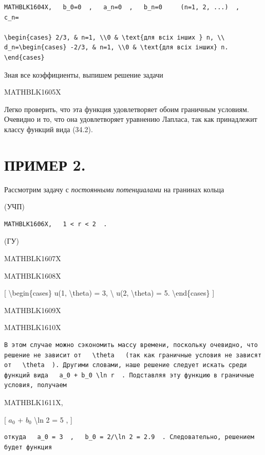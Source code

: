 \documentclass[
]{article}
\begin{document}
{{{\begin{verbatim}
MATHBLK1604X,   b_0=0  ,   a_n=0  ,   b_n=0     (n=1, 2, ...)  ,   c_n=

\begin{cases} 2/3, & n=1, \\0 & \text{для всіх інших } n, \\ d_n=\begin{cases} -2/3, & n=1, \\0 & \text{для всіх інших} n. \end{cases}
\end{verbatim}

Зная все коэффициенты, выпишем решение задачи

MATHBLK1605X

Легко проверить, что эта функция удовлетворяет обоим граничным условиям.
Очевидно и то, что она удовлетворяет уравнению Лапласа, так как
принадлежит классу функций вида (34.2).

\section{ПРИМЕР 2.}\label{ux43fux440ux438ux43cux435ux440-2.}

Рассмотрим задачу с \emph{постоянными потенциалами} на гранинах кольца

(УЧП)

\begin{verbatim}
MATHBLK1606X,   1 < r < 2  .
\end{verbatim}

(ГУ)

MATHBLK1607X

MATHBLK1608X

{[} \textbackslash begin\{cases\} u(1, \textbackslash theta) = 3,
\textbackslash{} u(2, \textbackslash theta) = 5.
\textbackslash end\{cases\} {]}

MATHBLK1609X

MATHBLK1610X

\begin{verbatim}
В этом случае можно сэкономить массу времени, поскольку очевидно, что решение не зависит от   \theta   (так как граничные условия не зависят от   \theta  ). Другими словами, наше решение следует искать среди функций вида   a_0 + b_0 \ln r  . Подставляя эту функцию в граничные условия, получаем
\end{verbatim}

MATHBLK1611X,

{[} \(a_0\) + \(b_0\) \textbackslash ln 2 = 5 , {]}

\begin{verbatim}
откуда   a_0 = 3  ,   b_0 = 2/\ln 2 = 2.9  . Следовательно, решением будет функция
\end{verbatim}

}}}
\end{document}
